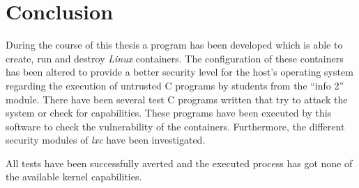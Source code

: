 \chapter{Conclusion}

During the course of this thesis a program has been developed which is able to
create, run and destroy \textit{Linux} containers. The configuration of these containers
has been altered to provide a better security level for the host's operating system
regarding the execution of untrusted C programs by students from the ``info 2'' module.
There have been several test C programs written that try to attack the system or
check for capabilities. These programs have been executed by this software to
check the vulnerability of the containers.
Furthermore, the different security modules of \textit{lxc} have been investigated.

All tests have been successfully averted and the executed process has got none of the
available kernel capabilities.
